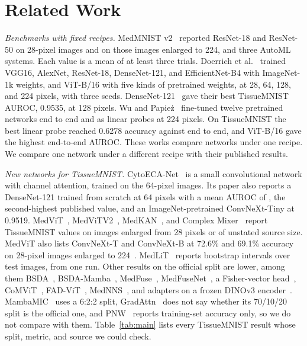 \documentclass[conference]{IEEEtran}
\newif\ifanycitation
\let\citeAnyKey\cite
\renewcommand{\cite}{\global\anycitationtrue\citeAnyKey}
\begin{document}
\section{Related Work}

\emph{Benchmarks with fixed recipes.} MedMNIST v2~\cite{yang2023medmnistv2} reported
ResNet-18 and ResNet-50 on 28-pixel images and on those images enlarged to 224, and three
AutoML systems. Each value is a mean of at least three trials. Doerrich et
al.~\cite{doerrich2025medmnistplus} trained VGG16, AlexNet, ResNet-18, DenseNet-121, and
EfficientNet-B4 with ImageNet-1k weights, and ViT-B/16 with five kinds of pretrained
weights, at 28, 64, 128, and 224 pixels, with three seeds. DenseNet-121~\cite{huang2017densenet}
gave their best TissueMNIST AUROC, 0.9535, at 128 pixels. Wu and
Papie\.{z}~\cite{wu2025rethinking} fine-tuned twelve pretrained networks end to end and
as linear probes at 224 pixels. On TissueMNIST the best linear probe reached 0.6278
accuracy against \baseBestAcc{} end to end, and ViT-B/16 gave the highest end-to-end
AUROC. These works compare networks under one recipe. We compare one network under a
different recipe with their published results.

\emph{New networks for TissueMNIST.} CytoECA-Net~\cite{arman2026cytoecanet} is a small
convolutional network with channel attention, trained on the 64-pixel images. Its paper
also reports a DenseNet-121 trained from scratch at 64 pixels with a mean AUROC of
\baseSecondAuroc{}, the second-highest published value, and an ImageNet-pretrained
ConvNeXt-Tiny at 0.9519. MedViT~\cite{manzari2023medvit},
MedViTV2~\cite{manzari2026medvitv2}, MedKAN~\cite{yang2025medkan}, and Complex
Mixer~\cite{zheng2023complexmixer} report TissueMNIST values on images enlarged from 28
pixels or of unstated source size. MedViT also lists ConvNeXt-T and ConvNeXt-B at 72.6\%
and 69.1\% accuracy on 28-pixel images enlarged to 224~\cite{manzari2023medvit}.
MedLiT~\cite{lee2026medlit} reports bootstrap intervals over test images, from one run.
Other results on the official split are lower, among them BSDA~\cite{zhu2024bsda},
BSDA-Mamba~\cite{wang2025bsdamamba}, MedFuse~\cite{ren2026medfuse},
MedFuseNet~\cite{mohammed2026medfusenet}, a Fisher-vector head~\cite{lyra2026fishervector},
CoMViT~\cite{safdar2025comvit}, FAD-ViT~\cite{safdar2026fadvit},
MedNNS~\cite{mecharbat2025mednns}, and adapters on a frozen DINOv3
encoder~\cite{doerrich2026mopet}. MambaMIC~\cite{zou2025mambamic} uses a 6:2:2 split,
GradAttn~\cite{ghoshal2026gradattn} does not say whether its 70/10/20 split is the
official one, and PNW~\cite{deng2026pnw} reports training-set accuracy only, so we do not
compare with them. Table~\ref{tab:main} lists every TissueMNIST result whose split,
metric, and source we could check.
\end{document}
